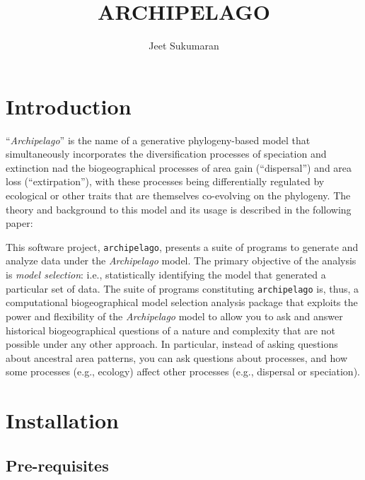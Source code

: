 \documentclass[11pt,openany]{memoir} %
\newcommand{\archipelagoModel}{\textit{Archipelago}\xspace}
\newcommand{\archipelagoPackage}{\texttt{archipelago}\xspace}
\begin{document}

\title{ARCHIPELAGO}
\author{Jeet Sukumaran}
\maketitle
{}

\tableofcontents

\chapter{Introduction}

``\archipelagoModel'' is the name of a generative phylogeny-based model that simultaneously incorporates the diversification processes of speciation and extinction nad the biogeographical processes of area gain (``dispersal'') and area loss (``extirpation''), with these processes being differentially regulated by ecological or other traits that are themselves co-evolving on the phylogeny.
The theory and background to this model and its usage is described in the following paper:


This software project, \archipelagoPackage, presents a suite of programs to generate and analyze data under the \archipelagoModel model.
The primary objective of the analysis is \textit{model selection}: i.e., statistically identifying the model that generated a particular set of data.
The suite of programs constituting \archipelagoPackage is, thus, a computational biogeographical model selection analysis package that exploits the power and flexibility of the \archipelagoModel model to allow you to ask and answer historical biogeographical questions of a nature and complexity that are not possible under any other approach.
In particular, instead of asking questions about ancestral area patterns, you can ask questions about processes, and how some processes (e.g., ecology) affect other processes (e.g., dispersal or speciation).

\chapter{Installation}

\section{Pre-requisites}
\end{document}
